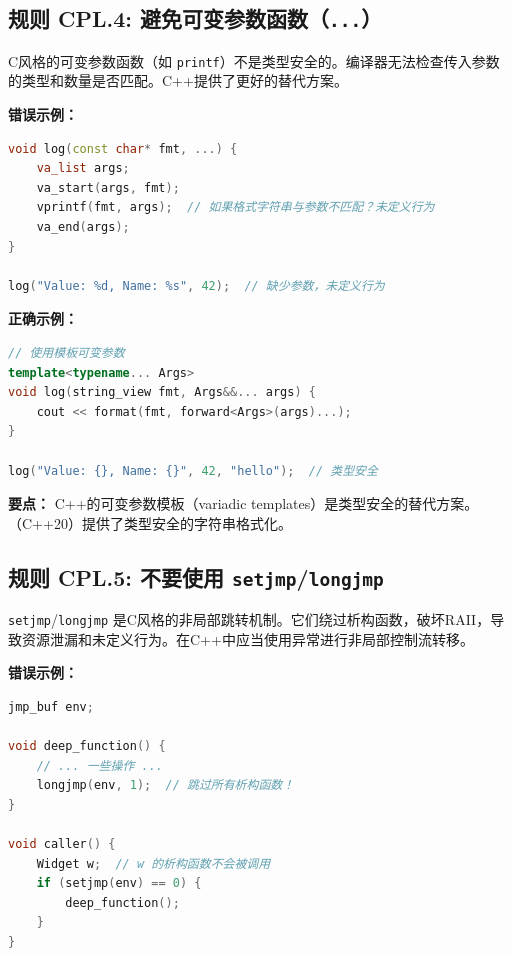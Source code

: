 \subsection*{\textbf{规则 CPL.4:} 避免可变参数函数（\texttt{...}）}

C风格的可变参数函数（如 \texttt{printf}）不是类型安全的。编译器无法检查传入参数的类型和数量是否匹配。C++提供了更好的替代方案。

\textbf{错误示例：}

\begin{lstlisting}[language=C++]
void log(const char* fmt, ...) {
    va_list args;
    va_start(args, fmt);
    vprintf(fmt, args);  // 如果格式字符串与参数不匹配？未定义行为
    va_end(args);
}

log("Value: %d, Name: %s", 42);  // 缺少参数，未定义行为
\end{lstlisting}

\textbf{正确示例：}

\begin{lstlisting}[language=C++]
// 使用模板可变参数
template<typename... Args>
void log(string_view fmt, Args&&... args) {
    cout << format(fmt, forward<Args>(args)...);
}

log("Value: {}, Name: {}", 42, "hello");  // 类型安全
\end{lstlisting}

\textbf{要点：} C++的可变参数模板（variadic templates）是类型安全的替代方案。\texttt{}（C++20）提供了类型安全的字符串格式化。

\subsection*{\textbf{规则 CPL.5:} 不要使用 \texttt{setjmp}/\texttt{longjmp}}

\texttt{setjmp}/\allowbreak{}\texttt{longjmp} 是C风格的非局部跳转机制。它们绕过析构函数，破坏RAII，导致资源泄漏和未定义行为。在C++中应当使用异常进行非局部控制流转移。

\textbf{错误示例：}

\begin{lstlisting}[language=C++]
jmp_buf env;

void deep_function() {
    // ... 一些操作 ...
    longjmp(env, 1);  // 跳过所有析构函数！
}

void caller() {
    Widget w;  // w 的析构函数不会被调用
    if (setjmp(env) == 0) {
        deep_function();
    }
}
\end{lstlisting}

